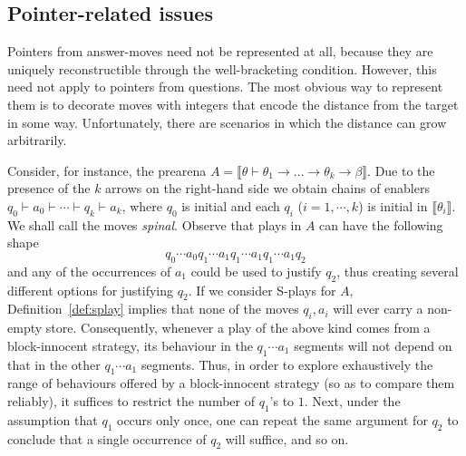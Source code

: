 \documentclass{CSML}
\theoremstyle{definition}\newtheorem{definition}[thm]{Definition}
\theoremstyle{definition}\newtheorem{example}[thm]{Example}
\theoremstyle{definition}\newtheorem{proposition}[thm]{Proposition}
\theoremstyle{definition}\newtheorem{lemma}[thm]{Lemma}
\theoremstyle{definition}\newtheorem{theorem}[thm]{Theorem}
\theoremstyle{definition}\newtheorem{corollary}[thm]{Corollary}
\theoremstyle{definition}\newtheorem{remark}[thm]{Remark}
\newcommand\nt[1]{#1}
\newcommand\ialoop{\mathsf{IA}_{\circlearrowright}}
\newcommand\iatwo{\ialoop^{2+}}
\newcommand{\rarr}{\rightarrow}
\newcommand\cutout[1]{}
\newcommand\sem[1]{\llbracket #1 \rrbracket}
\newcommand\seq[2]{{#1} \vdash {#2}}
\begin{document}
\subsection{Pointer-related issues}

Pointers from answer-moves need not be represented at all, because they are uniquely reconstructible through the well-bracketing condition.
However, this need not apply to pointers from questions. The most obvious way to represent them is to decorate moves
with integers that encode the distance from the target in some way. Unfortunately, there are scenarios in which the distance can grow arbitrarily.

\cutout{
Next we analyse two typing scenarios that look hopeless from the point of view of encoding
pointers, since the distance from the pointer can grow arbitrarily. In the first case, thanks to
block-innocence, we will be able to overcome the difficulties. The other case
must remain a challenge for future work (or an undecidability result). On the basis of 
our discussion we shall subsequently introduce the type system of $\iatwo$.
}
Consider, for instance,  the \nt{prearena} $A=\sem{\seq{\theta}{\theta_1\rarr\ldots\rarr \theta_k\rarr\beta}}$.
Due to the presence of the $k$ arrows on the right-hand side we obtain chains of enablers
$q_0\vdash a_0 \vdash \cdots \vdash q_k\vdash a_k$, where $q_0$ is initial and 
each $q_i$ ($i=1,\cdots,k$) is initial in $\sem{\theta_i}$. We shall call the moves \emph{spinal}.
Observe that plays in $A$ can have the following shape
\[
q_0\cdots a_0 q_1 \cdots a_1 q_1\cdots a_1 q_1\cdots a_1 q_2
\]
and any of the occurrences of $a_1$ could be used to justify $q_2$, thus creating several different options for justifying $q_2$.
If we consider S-plays for $A$, Definition~\ref{def:splay} implies that none of the moves $q_i,a_i$ will ever carry a non-empty store.
Consequently, whenever a play of the above kind comes from a block-innocent strategy, its behaviour in  the $q_1\cdots a_1$ segments
will not depend on that in the other $q_1\cdots a_1$ segments. Thus, in order to explore exhaustively the range of behaviours offered by a block-innocent strategy
(so as to compare them reliably), it suffices to restrict the number of $q_1$'s  to $1$.
Next, under the assumption that $q_1$ occurs only once, one can repeat the same argument for $q_2$ to conclude
that a single occurrence of $q_2$ will suffice, and so on.
\end{document}
